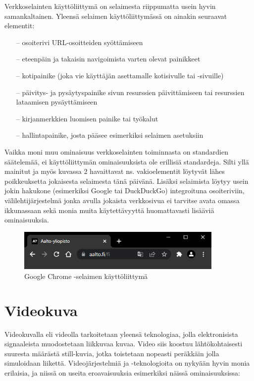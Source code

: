 \documentclass[finnish, 12pt, a4paper, elec, utf8, a-1b, online]{aaltothesis}
\begin{document}
\noindent Verkkoselainten käyttöliittymä on selaimesta riippumatta usein hyvin samankaltainen. Yleensä selaimen käyttöliittymässä on ainakin seuraavat elementit:
\begin{itemize}
  \item[--] osoiterivi URL-osoitteiden syöttämiseen
  \item[--] eteenpäin ja takaisin navigoimista varten olevat painikkeet
  \item[--] kotipainike (joka vie käyttäjän asettamalle kotisivulle tai -sivuille)
  \item[--] päivitys- ja pysäytyspainike sivun resurssien päivittämiseen tai resurssien lataamisen pysäyttämiseen
  \item[--] kirjanmerkkien luomisen painike tai työkalut
  \item[--] hallintapainike, josta pääsee esimerkiksi selaimen asetuksiin
\end{itemize}
Vaikka moni muu ominaisuus verkkoselainten toiminnasta on standardien säätelemää, ei käyttöliittymän ominaisuuksista ole erillisiä standardeja. Silti yllä mainitut ja myös kuvassa 2 havaittavat ns. vakioelementit löytyvät lähes poikkeuksetta jokaisesta selaimesta tänä päivänä. Lisäksi selaimista löytyy usein jokin hakukone (esimerkiksi Google tai DuckDuckGo) integroituna osoiteriviin, välilehtijärjestelmä jonka avulla jokaista verkkosivua ei tarvitse avata omassa ikkunassaan sekä monia muita käytettävyyttä huomattavasti lisääviä ominaisuuksia.

\begin{figure}[htb]
  \centering
  \includegraphics[height=2cm]{./img/browser-ui.png}
  \caption{Google Chrome -selaimen käyttöliittymä \label{kuva2}}
\end{figure}

\clearpage

\section{Videokuva}

Videokuvalla eli videolla tarkoitetaan yleensä teknologiaa, jolla elektronisista signaaleista muodostetaan liikkuvaa kuvaa. Video siis koostuu lähtökohtaisesti suuresta määrästä still-kuvia, jotka toistetaan nopeasti peräkkäin jolla simuloidaan liikettä. Videojärjestelmiä ja -teknologioita on nykyään hyvin monia erilaisia, ja niissä on useita eroavaisuuksia esimerkiksi näissä ominaisuuksissa:
\end{document}
